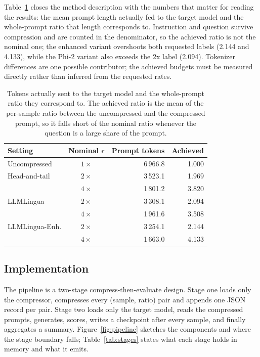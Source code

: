 ﻿\documentclass[10pt,a4paper,twocolumn]{article}
\begin{document}
Table~\ref{tab:budgets} closes the method description with the numbers that
matter for reading the results: the mean prompt length actually fed to the target
model and the whole-prompt ratio that length corresponds to. Instruction and
question survive compression and are counted in the denominator, so the achieved
ratio is not the nominal one; the enhanced variant overshoots both requested labels (2.144 and 4.133), while the Phi-2 variant also exceeds the 2x label (2.094). Tokenizer differences are one possible contributor; the achieved budgets must be measured directly rather than inferred from the requested rates.

\begin{table}[t]
\centering
\footnotesize
\begin{tabular}{@{}lcrr@{}}
\toprule
Setting & Nominal $r$ & Prompt tokens & Achieved \\
\midrule
Uncompressed   & $1\times$ & 6\,966.8 & 1.000 \\
Head-and-tail  & $2\times$ & 3\,523.1 & 1.969 \\
               & $4\times$ & 1\,801.2 & 3.820 \\
LLMLingua      & $2\times$ & 3\,308.1 & 2.094 \\
               & $4\times$ & 1\,961.6 & 3.508 \\
LLMLingua-Enh. & $2\times$ & 3\,254.1 & 2.144 \\
               & $4\times$ & 1\,663.0 & 4.133 \\
\bottomrule
\end{tabular}
\caption{Tokens actually sent to the target model and the whole-prompt ratio they
correspond to. The achieved ratio is the mean of the per-sample ratio between the
uncompressed and the compressed prompt, so it falls short of the nominal ratio
whenever the question is a large share of the prompt.}
\label{tab:budgets}
\end{table}

\subsection{Implementation}
\label{sec:implementation}

The pipeline is a two-stage compress-then-evaluate design. Stage one loads only
the compressor, compresses every (sample, ratio) pair and appends one JSON record
per pair. Stage two loads only the target model, reads the compressed prompts,
generates, scores, writes a checkpoint after every sample, and finally aggregates
a summary. Figure~\ref{fig:pipeline} sketches the components and where the stage
boundary falls; Table~\ref{tab:stages} states what each stage holds in memory and
what it emits.
\end{document}
